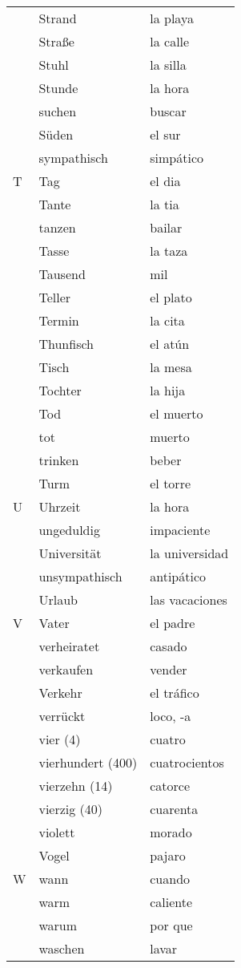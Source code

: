 \documentclass[10pt,spanish]{article}
\begin{document}
\begin{longtable}{p{} p{} | p{}}
& Strand & la playa  \\
& Straße & la calle  \\
& Stuhl & la silla  \\
& Stunde & la hora  \\
& suchen & buscar  \\
& Süden & el sur  \\
& sympathisch & simpático \\
T & Tag & el dia  \\
& Tante & la tia  \\
& tanzen & bailar  \\
& Tasse & la taza  \\
& Tausend & mil  \\
& Teller & el plato  \\
& Termin & la cita  \\
& Thunfisch & el atún \\
& Tisch & la mesa  \\
& Tochter & la hija  \\
& Tod & el muerto \\
& tot & muerto \\
& trinken & beber  \\
& Turm & el torre  \\
U & Uhrzeit & la hora  \\
& ungeduldig & impaciente \\
& Universität & la universidad \\
& unsympathisch & antipático\\
& Urlaub & las vacaciones  \\
V & Vater & el padre  \\
& verheiratet & casado  \\
& verkaufen & vender  \\
& Verkehr & el tráfico \\
& verrückt & loco, -a  \\
& vier (4) & cuatro  \\
& vierhundert (400) & cuatrocientos  \\
& vierzehn (14) & catorce  \\
& vierzig (40) & cuarenta  \\
& violett & morado  \\
& Vogel & pajaro  \\
W & wann & cuando  \\
& warm & caliente  \\
& warum & por que  \\
& waschen & lavar  \\

\end{longtable}
\end{document}
